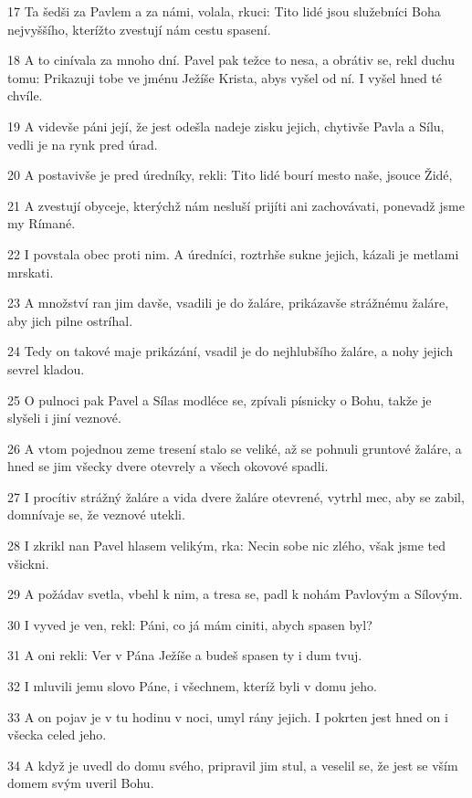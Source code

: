 \par 17 Ta šedši za Pavlem a za námi, volala, rkuci: Tito lidé jsou služebníci Boha nejvyššího, kterížto zvestují nám cestu spasení.
\par 18 A to cinívala za mnoho dní. Pavel pak težce to nesa, a obrátiv se, rekl duchu tomu: Prikazuji tobe ve jménu Ježíše Krista, abys vyšel od ní. I vyšel hned té chvíle.
\par 19 A videvše páni její, že jest odešla nadeje zisku jejich, chytivše Pavla a Sílu, vedli je na rynk pred úrad.
\par 20 A postavivše je pred úredníky, rekli: Tito lidé bourí mesto naše, jsouce Židé,
\par 21 A zvestují obyceje, kterýchž nám nesluší prijíti ani zachovávati, ponevadž jsme my Rímané.
\par 22 I povstala obec proti nim. A úredníci, roztrhše sukne jejich, kázali je metlami mrskati.
\par 23 A množství ran jim davše, vsadili je do žaláre, prikázavše strážnému žaláre, aby jich pilne ostríhal.
\par 24 Tedy on takové maje prikázání, vsadil je do nejhlubšího žaláre, a nohy jejich sevrel kladou.
\par 25 O pulnoci pak Pavel a Sílas modléce se, zpívali písnicky o Bohu, takže je slyšeli i jiní veznové.
\par 26 A vtom pojednou zeme tresení stalo se veliké, až se pohnuli gruntové žaláre, a hned se jim všecky dvere otevrely a všech okovové spadli.
\par 27 I procítiv strážný žaláre a vida dvere žaláre otevrené, vytrhl mec, aby se zabil, domnívaje se, že veznové utekli.
\par 28 I zkrikl nan Pavel hlasem velikým, rka: Necin sobe nic zlého, však jsme ted všickni.
\par 29 A požádav svetla, vbehl k nim, a tresa se, padl k nohám Pavlovým a Sílovým.
\par 30 I vyved je ven, rekl: Páni, co já mám ciniti, abych spasen byl?
\par 31 A oni rekli: Ver v Pána Ježíše a budeš spasen ty i dum tvuj.
\par 32 I mluvili jemu slovo Páne, i všechnem, kteríž byli v domu jeho.
\par 33 A on pojav je v tu hodinu v noci, umyl rány jejich. I pokrten jest hned on i všecka celed jeho.
\par 34 A když je uvedl do domu svého, pripravil jim stul, a veselil se, že jest se vším domem svým uveril Bohu.
